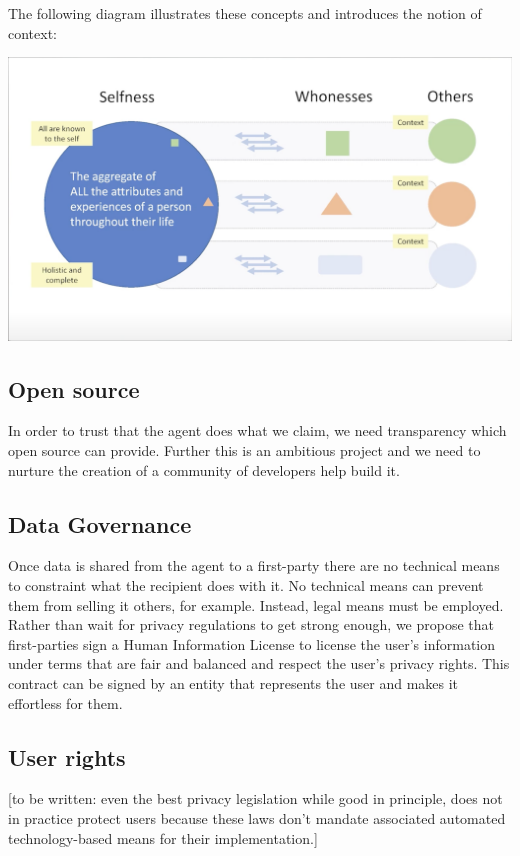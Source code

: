 \documentclass[11pt, oneside]{article}   	%
\begin{document}
The following diagram illustrates these concepts and introduces the notion of context:

\includegraphics[width=\textwidth]{./images/selfness-and-whoness-larger.png}

\subsection{Open source}

In order to trust that the agent does what we claim, we need transparency which open source can provide. Further this is an ambitious project and we need to nurture the creation of a community of developers help build it.

\subsection{Data Governance}

Once data is shared from the agent to a first-party there are no technical means to constraint what the recipient does with it. No technical means can prevent them from selling it others, for example. Instead, legal means must be employed. Rather than wait for privacy regulations to get strong enough, we propose that first-parties sign a Human Information License to license the user's information under terms that are fair and balanced and respect the user's privacy rights. This contract can be signed by an entity that represents the user and makes it effortless for them.

\subsection{User rights}

[to be written: even the best privacy legislation while good in principle, does not in practice protect users because these laws don't mandate associated automated technology-based means for their implementation.]
\end{document}
